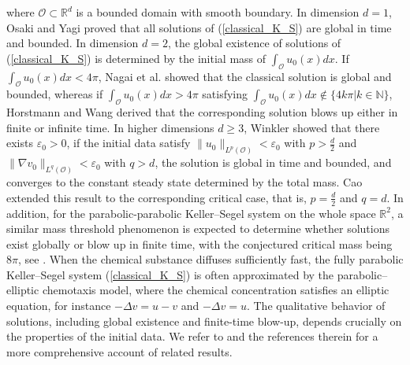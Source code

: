 \documentclass[reqno, 11pt]{amsart}
\theoremstyle{definition}
\numberwithin{equation}{section} \numberwithin{lem}{section}
\numberwithin{thm}{section} \numberwithin{prop}{section}
\numberwithin{cor}{section} \numberwithin{rem}{section}
\numberwithin{defn}{section}
\begin{document}
where $\mathcal{O}\subset\mathbb{R}^d$ is a bounded domain with smooth boundary. In dimension $d=1$, Osaki and Yagi \cite{osaki2001finite} proved that all solutions of (\ref{classical_K_S}) are global in time and bounded. In dimension $d=2$,  the global existence of solutions of (\ref{classical_K_S}) is determined by the initial mass of $\int _\mathcal{O} u_0(x)dx$.  If $\int _\mathcal{O} u_0(x)dx<{4\pi}$, Nagai et al. \cite{nagai1997application} showed that the classical solution is global and bounded, whereas if $\int _\mathcal{O} u_0(x)dx>{4\pi}$ satisfying $\int _\mathcal{O} u_0(x)dx\notin \{4k\pi|k\in\mathbb{N}\}$, Horstmann and Wang \cite{horstmann2001blow} derived that the corresponding solution  blows up either in finite or infinite time. In  higher dimensions $d\ge 3$, Winkler \cite{winkler2010aggregation} showed that there exists $\varepsilon_0>0$, if  the  initial data satisfy $\|u_0\|_{L^p(\mathcal{O})}<\varepsilon_0$ with $p>\frac{d}{2}$ and  $\|\nabla v_0\|_{L^q(\mathcal{O})}<\varepsilon_0$ with $q>d$, the solution is global in time and bounded, and converges to the constant steady state determined by the total mass. Cao \cite{cao2015global} extended this result to the corresponding critical case, that is, $p=\frac{d}{2}$ and $q=d$. In addition,  for the parabolic-parabolic Keller–Segel system on the whole space $\mathbb{R}^2$, a similar mass threshold phenomenon is expected to determine whether solutions exist globally or blow up in finite time, with the conjectured critical mass being $8\pi $, see \cite{herrero1997blow,calvez2008parabolic,nagai2011brezis,mizoguchi2013global,corrias2006critical}. When the chemical substance diffuses sufficiently fast, the fully parabolic Keller–Segel system (\ref{classical_K_S}) is often approximated by the parabolic–elliptic chemotaxis model, where the chemical concentration satisfies an elliptic equation, for instance $-\Delta v=u- v$ and $-\Delta v=u$. The qualitative behavior of solutions, including global existence and finite-time blow-up, depends crucially on the properties of the initial data. We refer to \cite{blanchet2006two,nagai1997application,herrero1996chemotactic,blanchet2009critical,sugiyama2010blow} and the references therein for a more comprehensive account of related results.
 
\end{document}
